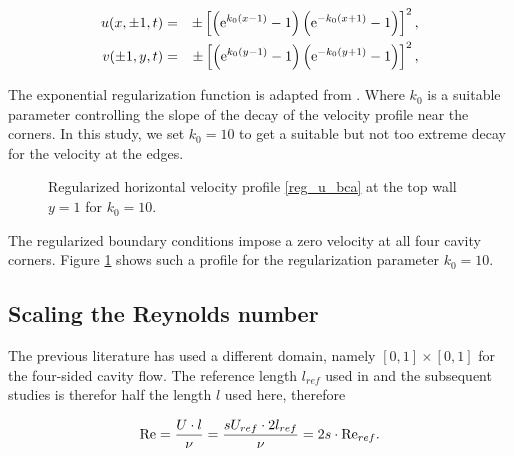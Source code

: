\begin{eqnarray}
u(x,\pm 1,t) & = & \pm\left[\left(\mathrm{e}^{k_0(x - 1)} - 1\right)
  \left(\mathrm{e}^{-k_0(x + 1)} - 1\right)\right]^2,\label{reg_u_bca} \\
v(\pm 1,y,t) & = & \pm\left[\left(\mathrm{e}^{k_0(y - 1)} - 1\right)
  \left(\mathrm{e}^{-k_0(y + 1)} - 1\right)\right]^2,\label{reg_u_bcb}
\end{eqnarray}

The exponential regularization function is adapted from \citet{lopez2017}. Where
$k_0$ is a suitable parameter controlling the slope of the decay of the
velocity profile near the corners. In this study, we set $k_0=10$ to get a
suitable but not too extreme decay for the velocity at the edges. 

\begin{figure}[h!]
\center
{}
\caption{\label{bc_profile} Regularized horizontal velocity profile
  \eqref{reg_u_bca} at the top wall $y=1$ for $k_0=10$.}
\end{figure}

The regularized boundary conditions impose a zero velocity at all four cavity
corners. Figure \ref{bc_profile} shows such a profile for the regularization
parameter $k_0=10$.

\subsection{Scaling the Reynolds number}

The previous literature has used a different domain, namely $[0,1] \times
[0,1]$ for the four-sided cavity flow. The reference length $l_{ref}$ used in
\citet{wahba2009} and the subsequent studies is therefor half the length $l$
used here, therefore

\begin{align}
\mathrm{Re} = \frac{U \cdot l}{\nu} 
  = \frac{sU_{ref} \cdot 2l_{ref}}{\nu} = 2s \cdot \mathrm{Re}_{ref}.
\end{align}

